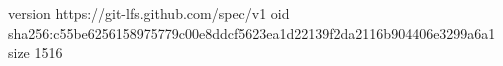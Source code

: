 version https://git-lfs.github.com/spec/v1
oid sha256:c55be6256158975779c00e8ddcf5623ea1d22139f2da2116b904406e3299a6a1
size 1516
